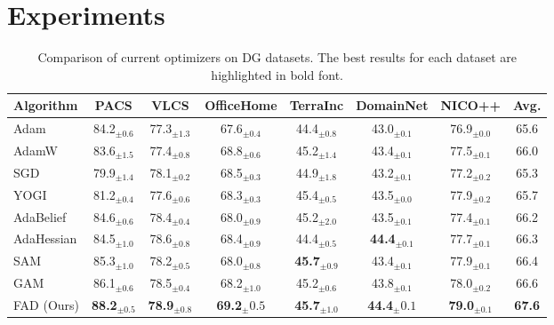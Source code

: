 \section{Experiments}
\begin{table}[th]
\centering
\caption{Comparison of current optimizers on DG datasets. The best results for each dataset are highlighted in bold font.}
\begin{tabular}{lcccccc|c}
\toprule
\textbf{Algorithm} & PACS & VLCS & OfficeHome & TerraInc & DomainNet & NICO++ & \textbf{Avg.} \\
\midrule

Adam \cite{kingma2014adam} & 84.2$_{\pm 0.6}$ & 77.3$_{\pm 1.3}$ & 67.6$_{\pm 0.4}$ & 44.4$_{\pm 0.8}$ & 43.0$_{\pm 0.1}$ & 76.9$_{\pm 0.0}$ & 65.6 \\
AdamW \cite{loshchilov2017decoupled} & 83.6$_{\pm 1.5}$ & 77.4$_{\pm 0.8}$ & 68.8$_{\pm 0.6}$ & 45.2$_{\pm 1.4}$ & 43.4$_{\pm 0.1}$ & 77.5$_{\pm 0.1}$ & 66.0 \\
SGD \cite{nesterov1983method} & 79.9$_{\pm 1.4}$ & 78.1$_{\pm 0.2}$ & 68.5$_{\pm 0.3}$ & 44.9$_{\pm 1.8}$ & 43.2$_{\pm 0.1}$ & 77.2$_{\pm 0.2}$ & 65.3 \\
YOGI \cite{zaheer2018adaptive} & 81.2$_{\pm 0.4}$ & 77.6$_{\pm 0.6}$ & 68.3$_{\pm 0.3}$ & 45.4$_{\pm 0.5}$ & 43.5$_{\pm 0.0}$ & 77.9$_{\pm 0.2}$ & 65.7 \\
AdaBelief \cite{zhuang2020adabelief} & 84.6$_{\pm 0.6}$ & 78.4$_{\pm 0.4}$ & 68.0$_{\pm 0.9}$ & 45.2$_{\pm 2.0}$ & 43.5$_{\pm 0.1}$ & 77.4$_{\pm 0.1}$ & 66.2 \\
AdaHessian \cite{yao2021adahessian} & 84.5$_{\pm 1.0}$ & 78.6$_{\pm 0.8}$ & 68.4$_{\pm 0.9}$ & 44.4$_{\pm 0.5}$ & \textbf{44.4}$_{\pm 0.1}$ & 77.7$_{\pm 0.1}$ & 66.3 \\
SAM \cite{foret2021sharpness} & 85.3$_{\pm 1.0}$ & 78.2$_{\pm 0.5}$ & 68.0$_{\pm 0.8}$ & \textbf{45.7}$_{\pm 0.9}$ & 43.4$_{\pm 0.1}$ & 77.9$_{\pm 0.1}$ & 66.4 \\
GAM \cite{Zhang2023GradientNA} & 86.1$_{\pm 0.6}$ & 78.5$_{\pm 0.4}$ & 68.2$_{\pm 1.0}$ & 45.2$_{\pm 0.6}$ & 43.8$_{\pm 0.1}$ & 78.0$_{\pm 0.2}$ & 66.6 \\
\midrule
FAD (Ours) & \textbf{88.2}$_{\pm 0.5}$ & \textbf{78.9}$_{\pm 0.8}$  &  \textbf{69.2}$_{\pm }0.5$ & \textbf{45.7}$_{\pm 1.0}$ &  \textbf{44.4}$_{\pm }0.1$ & \textbf{79.0}$_{\pm 0.1}$ & \textbf{67.6} \\
\bottomrule
\end{tabular}
\label{tab:dg-optimizer}
\end{table}


